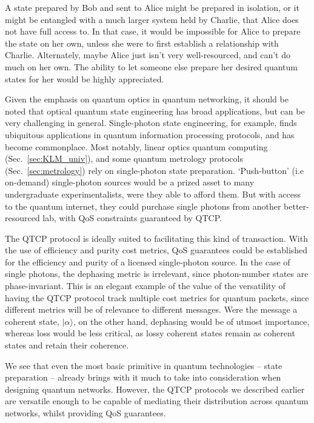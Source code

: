 \documentclass[aps,rmp,twocolumn,amsmath,amssymb,nofootinbib,superscriptaddress]{revtex4}
\newcommand{\ket}[1]{|#1\rangle}
\begin{document}
A state prepared by Bob and sent to Alice might be prepared in isolation, or it might be entangled with a much larger system held by Charlie, that Alice does not have full access to. In that case, it would be impossible for Alice to prepare the state on her own, unless she were to first establish a relationship with Charlie. Alternately, maybe Alice just isn't very well-resourced, and can't do much on her own. The ability to let someone else prepare her desired quantum states for her would be highly appreciated.

Given the emphasis on quantum optics in quantum networking, it should be noted that optical quantum state engineering has broad applications, but can be very challenging in general. Single-photon state engineering, for example, finds ubiquitous applications in quantum information processing protocols, and has become commonplace. Most notably, linear optics quantum computing (Sec.~\ref{sec:KLM_univ}), and some quantum metrology protocols (Sec.~\ref{sec:metrology}) rely on single-photon state preparation. `Push-button' (i.e on-demand) single-photon sources would be a prized asset to many undergraduate experimentalists, were they able to afford them. But with access to the quantum internet, they could purchase single photons from another better-resourced lab, with QoS constraints guaranteed by QTCP.

The QTCP protocol is ideally suited to facilitating this kind of transaction. With the use of efficiency and purity cost metrics, QoS guarantees could be established for the efficiency and purity of a licensed single-photon source. In the case of single photons, the dephasing metric is irrelevant, since photon-number states are phase-invariant. This is an elegant example of the value of the versatility of having the QTCP protocol track multiple cost metrics for quantum packets, since different metrics will be of relevance to different messages. Were the message a coherent state, $\ket\alpha$, on the other hand, dephasing would be of utmost importance, whereas loss would be less critical, as lossy coherent states remain as coherent states and retain their coherence.

We see that even the most basic primitive in quantum technologies -- state preparation -- already brings with it much to take into consideration when designing quantum networks. However, the QTCP protocols we described earlier are versatile enough to be capable of mediating their distribution across quantum networks, whilst providing QoS guarantees.
\end{document}
